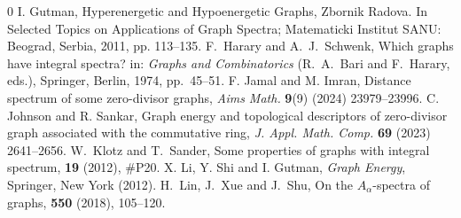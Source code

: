 \documentclass[12pt,twoside]{article}
\begin{document}
\begin{thebibliography}{0}
		 I. Gutman, Hyperenergetic and Hypoenergetic Graphs, Zbornik Radova. In Selected Topics on Applications of Graph Spectra; Matematicki Institut SANU: Beograd, Serbia, 2011, pp. 113--135.
		F.~Harary and A.~J.~Schwenk,
		\newblock Which graphs have integral spectra?
		\newblock in: {\em Graphs and Combinatorics} (R.~A.~Bari and F.~Harary, eds.),
		\newblock Springer, Berlin, 1974, pp.~45--51.
		 F. Jamal and M. Imran, Distance spectrum of some zero-divisor graphs, \emph{Aims Math.} \textbf{9}(9) (2024) 23979--23996.
		 C. Johnson and  R. Sankar, Graph energy and topological descriptors of zero-divisor graph associated with the commutative ring, \emph{J. Appl. Math. Comp.} \textbf{69} (2023) 2641--2656.%
		W.~Klotz and T.~Sander,
		\newblock Some properties of graphs with integral spectrum,
		 {\bf 19} (2012), \#P20.
		 X. Li, Y. Shi and I. Gutman, \textit{Graph Energy}, Springer, New York (2012).
		H.~Lin, J.~Xue and J.~Shu,
		\newblock On the $A_{\alpha}$-spectra of graphs,
		 {\bf 550} (2018), 105--120.
		

\end{thebibliography}
\end{document}
